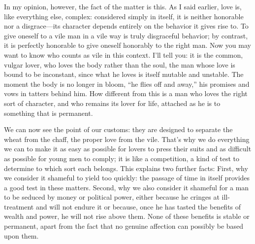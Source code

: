 In my opinion, however, the fact of the matter is this. As I said
earlier, love is, like everything else, complex: considered simply in
itself, it is neither honorable nor a disgrace---its character depends
entirely on the behavior it gives rise to. To give oneself to a vile man
in a vile way is truly disgraceful behavior; by contrast, it is
perfectly honorable to give oneself honorably to the right man. Now you
may want to know who  counts as vile in this context. I’ll tell
you: it is the common, vulgar lover, who loves the body rather than the
soul, the man whose love is bound to be inconstant, since what he loves
is itself mutable and unstable. The moment the body is no longer in
bloom, “he flies off and
away,” his promises
and vows in tatters behind him. How different from this is a man who
loves the right sort of character, and who remains its lover for
 life, attached as he is to something that is permanent.

We can now see the point of our customs: they are designed to separate
the wheat from the chaff, the proper love from the vile. That’s why we
do everything we can to make it as easy as possible for lovers to press
their suits and as difficult as possible for young men to comply; it is
like a competition, a kind of test to determine to which sort each
belongs. This explains two further facts: First, why we consider it
shameful to yield too quickly: the passage of time in itself provides a
good test in these matters.  Second, why we also consider it
shameful for a man to be seduced by money or political power, either
because he cringes at ill-treatment and will not endure it or because,
once he has tasted the benefits of wealth and power, he will not rise
above them. None of these benefits is stable or permanent, apart from
the fact that no genuine affection can possibly be based upon them.

